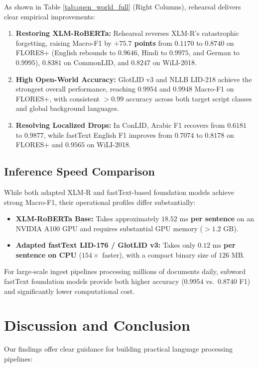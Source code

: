 \documentclass[11pt]{article}
\begin{document}
As shown in Table \ref{tab:open_world_full} (Right Columns), rehearsal delivers clear empirical improvements:
\begin{enumerate}
    \item \textbf{Restoring XLM-RoBERTa:} Rehearsal reverses XLM-R's catastrophic forgetting, raising Macro-F1 by \textbf{$+75.7$ points} from $0.1170$ to \textbf{$0.8740$} on FLORES+ (English rebounds to $0.9646$, Hindi to $0.9975$, and German to $0.9995$), $0.8381$ on CommonLID, and $0.8247$ on WiLI-2018.
    \item \textbf{High Open-World Accuracy:} GlotLID v3 and NLLB LID-218 achieve the strongest overall performance, reaching \textbf{$0.9954$} and \textbf{$0.9948$} Macro-F1 on FLORES+, with consistent $>0.99$ accuracy across both target script classes and global background languages.
    \item \textbf{Resolving Localized Drops:} In ConLID, Arabic F1 recovers from $0.6181$ to \textbf{$0.9877$}, while fastText English F1 improves from $0.7074$ to \textbf{$0.8178$} on FLORES+ and $0.9565$ on WiLI-2018.
\end{enumerate}

\subsection{Inference Speed Comparison}
While both adapted XLM-R and fastText-based foundation models achieve strong Macro-F1, their operational profiles differ substantially:
\begin{itemize}
    \item \textbf{XLM-RoBERTa Base:} Takes approximately \textbf{$18.52\text{ ms}$ per sentence} on an NVIDIA A100 GPU and requires substantial GPU memory ($>1.2\text{ GB}$).
    \item \textbf{Adapted fastText LID-176 / GlotLID v3:} Takes only \textbf{$0.12\text{ ms}$ per sentence on CPU} ($154\times$ faster), with a compact binary size of $126\text{ MB}$.
\end{itemize}
For large-scale ingest pipelines processing millions of documents daily, subword fastText foundation models provide both higher accuracy ($0.9954$ vs.\ $0.8740$ F1) and significantly lower computational cost.

\section{Discussion and Conclusion}
\label{sec:conclusion}

Our findings offer clear guidance for building practical language processing pipelines:
\end{document}
